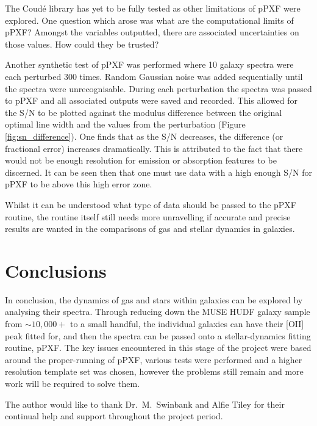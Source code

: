 \documentclass[12pt, twocolumn]{revtex4}    %
\begin{document}
The Coud{\'e} library has yet to be fully tested as other limitations of pPXF were explored. One question which arose was what are the computational limits of pPXF? Amongst the variables outputted, there are associated uncertainties on those values. How could they be trusted? 

Another synthetic test of pPXF was performed where 10 galaxy spectra were each perturbed 300 times. Random Gaussian noise was added sequentially until the spectra were unrecognisable. During each perturbation the spectra was passed to pPXF and all associated outputs were saved and recorded. This allowed for the S/N to be plotted against the modulus difference between the original optimal line width and the values from the perturbation (Figure \ref{fig:sn_difference}). One finds that as the S/N decreases, the difference (or fractional error) increases dramatically. This is attributed to the fact that there would not be enough resolution for emission or absorption features to be discerned. It can be seen then that one must use data with a high enough S/N for pPXF to be above this high error zone.


Whilst it can be understood what type of data should be passed to the pPXF routine, the routine itself still needs more unravelling if accurate and precise results are wanted in the comparisons of gas and stellar dynamics in galaxies.


%

\section{Conclusions}
\noindent
In conclusion, the dynamics of gas and stars within galaxies can be explored by analysing their spectra. Through reducing down the MUSE HUDF galaxy sample from $\sim10,000+$ to a small handful, the individual galaxies can have their [OII] peak fitted for, and then the spectra can be passed onto a stellar-dynamics fitting routine, pPXF. The key issues encountered in this stage of the project were based around the proper-running of pPXF, various tests were performed and a higher resolution template set was chosen, however the problems still remain and more work will be required to solve them.

\begin{acknowledgments}
The author would like to thank Dr.~M.~Swinbank and Alfie Tiley for their continual help and support throughout the project period.
\end{acknowledgments}



\end{document}
